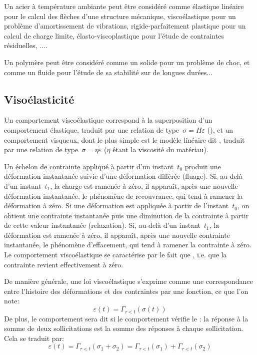 Un acier à température ambiante peut être considéré comme élastique linéaire pour le calcul des
flèches d'une structure mécanique, viscoélastique pour un problème d'amortissement de vibrations,
rigide-parfaitement plastique pour un calcul de charge limite, élasto-viscoplastique pour l'étude de
contraintes résiduelles, ....

Un polymère peut être considéré comme un solide pour un problème de choc, et comme un fluide
pour l'étude de sa stabilité sur de longues durées...


\medskip
\subsection{Visoélasticité}
Un comportement viscoélastique correspond à la superposition d'un comportement
élastique, traduit par une relation de type~$\sigma = H\varepsilon$ (),
et un comportement visqueux, dont le plus simple est le modèle linéaire dit ,
traduit par une relation de type~$\sigma=\eta\dot{\varepsilon}$ ($\eta$ étant la viscosité
du matériau).

\medskip
Un échelon de contrainte appliqué à partir d'un instant~$t_0$ produit une déformation instantanée
suivie d'une déformation différée (fluage).
Si, au-delà d'un instant~$t_1$, la charge est ramenée à zéro, il apparaît, après une nouvelle déformation
instantanée, le phénomène de recouvrance, qui tend à ramener la déformation à zéro.
\medskipvm
Si une déformation est appliquée à partir de l'instant~$t_0$, on obtient une contrainte instantanée
puis une diminution de la contrainte à partir de cette valeur instantanée (relaxation).
Si, au-delà d'un instant~$t_1$, la déformation est ramenée à zéro, il apparaît, après une nouvelle contrainte
instantanée, le phénomène d'effacement, qui tend à ramener la contrainte à zéro.
\medskipvm
Le comportement viscoélastique se caractérise par le fait que , i.e. que la contrainte revient effectivement à zéro.

\medskip
De manière générale, une loi viscoélastique s'exprime comme une correspondance entre l'histoire
des déformations et des contraintes par une fonction, ce que l'on note:
\begin{equation} \varepsilon(t) =\Gamma_{\tau<t}(\sigma(t)) \end{equation}
De plus, le comportement sera dit  si le comportement vérifie
le :
la réponse à la somme de deux sollicitations
est la somme des réponses à chaque sollicitation. Cela se traduit par:
\begin{equation} \varepsilon(t) = \Gamma_{\tau<t}(\sigma_1+\sigma_2) = \Gamma_{\tau<t}(\sigma_1)
+\Gamma_{\tau<t}(\sigma_2) \end{equation}


